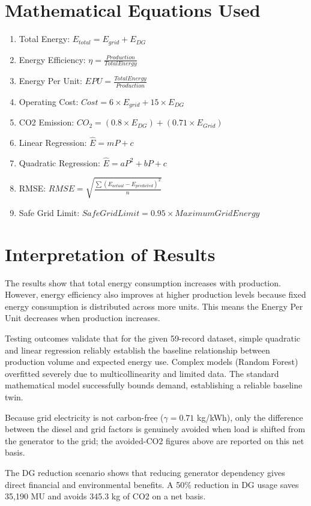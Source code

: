 \section{Mathematical Equations Used}
\begin{enumerate}
    \item Total Energy: $E_{total} = E_{grid} + E_{DG}$
    \item Energy Efficiency: $\eta = \frac{Production}{Total Energy}$
    \item Energy Per Unit: $EPU = \frac{Total Energy}{Production}$
    \item Operating Cost: $Cost = 6 \times E_{grid} + 15 \times E_{DG}$
    \item CO2 Emission: $CO_2 = (0.8 \times E_{DG}) + (0.71 \times E_{Grid})$
    \item Linear Regression: $\hat{E} = mP + c$
    \item Quadratic Regression: $\hat{E} = aP^2 + bP + c$
    \item RMSE: $RMSE = \sqrt{\frac{\sum(E_{actual} - E_{predicted})^2}{n}}$
    \item Safe Grid Limit: $Safe Grid Limit = 0.95 \times Maximum Grid Energy$
\end{enumerate}

\section{Interpretation of Results}
The results show that total energy consumption increases with production. However, energy efficiency also improves at higher production levels because fixed energy consumption is distributed across more units. This means the Energy Per Unit decreases when production increases.

Testing outcomes validate that for the given 59-record dataset, simple quadratic and linear regression reliably establish the baseline relationship between production volume and expected energy use. Complex models (Random Forest) overfitted severely due to multicollinearity and limited data. The standard mathematical model successfully bounds demand, establishing a reliable baseline twin.

Because grid electricity is not carbon-free ($\gamma = 0.71$ kg/kWh), only the difference between the diesel and grid factors is genuinely avoided when load is shifted from the generator to the grid; the avoided-CO2 figures above are reported on this net basis.

The DG reduction scenario shows that reducing generator dependency gives direct financial and environmental benefits. A 50\% reduction in DG usage saves 35,190 MU and avoids 345.3 kg of CO2 on a net basis.

